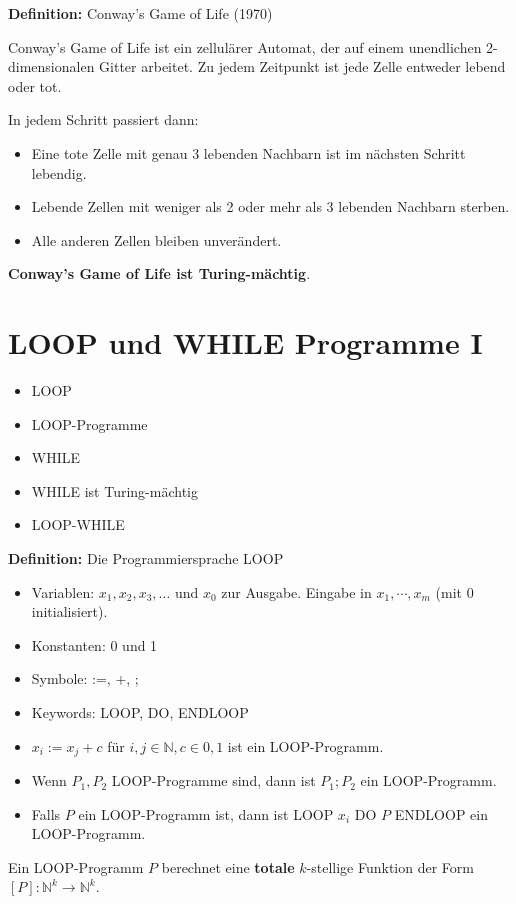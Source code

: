 \documentclass[a4paper,graphics,11pt]{article}
\begin{document}
\strut

\textbf{Definition:} Conway's Game of Life (1970)

Conway's Game of Life ist ein zellulärer Automat, der auf einem unendlichen 2-dimensionalen Gitter
arbeitet. Zu jedem Zeitpunkt ist jede Zelle entweder lebend oder tot.

In jedem Schritt passiert dann:
\begin{itemize}
    \item Eine tote Zelle mit genau 3 lebenden Nachbarn ist im nächsten Schritt lebendig.
    \item Lebende Zellen mit weniger als 2 oder mehr als 3 lebenden Nachbarn sterben.
    \item Alle anderen Zellen bleiben unverändert.
\end{itemize}

\textbf{Conway's Game of Life ist Turing-mächtig}.

\newpage

\section{LOOP und WHILE Programme I}
\begin{itemize}
    \item LOOP
    \item LOOP-Programme
    \item WHILE
    \item WHILE ist Turing-mächtig
    \item LOOP-WHILE
\end{itemize}

\textbf{Definition:} Die Programmiersprache LOOP
\begin{itemize}
    \item Variablen: $x_1,x_2,x_3,\dots$ und $x_0$ zur Ausgabe.
        Eingabe in $x_1,\cdots,x_m$ (mit 0 initialisiert).
    \item Konstanten: 0 und 1
    \item Symbole: :=, +, ;
    \item Keywords: LOOP, DO, ENDLOOP
    \\
    \item $x_i := x_j + c$ für $i,j \in \mathbb{N}, c\in {0,1}$ ist ein LOOP-Programm.
    \item Wenn $P_1,P_2$ LOOP-Programme sind, dann ist $P_1;P_2$ ein LOOP-Programm.
    \item Falls $P$ ein LOOP-Programm ist, dann ist LOOP $x_i$ DO $P$ ENDLOOP ein LOOP-Programm.
\end{itemize}
Ein LOOP-Programm $P$ berechnet eine \textbf{totale} $k$-stellige Funktion der Form
$[P] : \mathbb{N}^k \to \mathbb{N}^k$.
\end{document}
